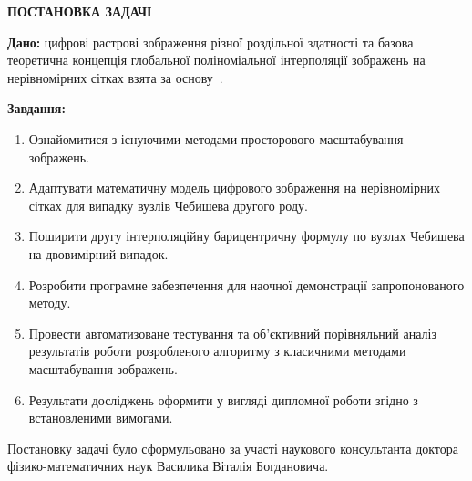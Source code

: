 \begin{center}
	\textbf{ПОСТАНОВКА ЗАДАЧІ}
\end{center}
\textbf{Дано:} цифрові растрові зображення різної роздільної здатності та базова теоретична концепція глобальної поліноміальної інтерполяції зображень на нерівномірних сітках взята за основу~\cite{occorsio2022lagrange}.

\textbf{Завдання:}
\begin{enumerate}
	\item Ознайомитися з існуючими методами просторового масштабування зображень.
	\item Адаптувати математичну модель цифрового зображення на нерівномірних сітках для випадку вузлів Чебишева другого роду.
	\item Поширити другу інтерполяційну барицентричну формулу по вузлах Чебишева на двовимірний випадок.
	\item Розробити програмне забезпечення для наочної демонстрації запропонованого методу.
	\item Провести автоматизоване тестування та об'єктивний порівняльний аналіз результатів роботи розробленого алгоритму з класичними методами масштабування зображень.
	\item Результати досліджень оформити у вигляді дипломної роботи згідно з встановленими вимогами.
\end{enumerate}

Постановку задачі було сформульовано за участі наукового консультанта доктора фізико-математичних наук Василика Віталія Богдановича.
\newpage
